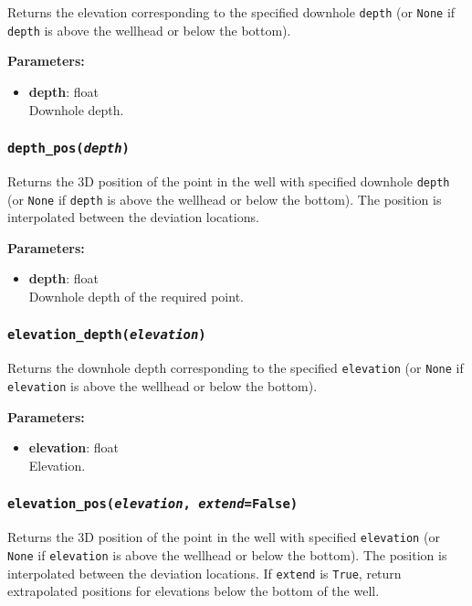 Returns the elevation corresponding to the specified downhole \texttt{depth} (or \texttt{None} if \texttt{depth} is above the wellhead or below the bottom).

\textbf{Parameters:}
\begin{itemize}
\item \textbf{depth}: float\\
  Downhole depth.
\end{itemize}

\subsubsection{\texttt{depth\_pos(\emph{depth})}}
\label{sec:well:depth_pos}

Returns the 3D position of the point in the well with specified downhole \texttt{depth} (or \texttt{None} if \texttt{depth} is above the wellhead or below the bottom).  The position is interpolated between the deviation locations.

\textbf{Parameters:}
\begin{itemize}
\item \textbf{depth}: float\\
  Downhole depth of the required point.
\end{itemize}

\subsubsection{\texttt{elevation\_depth(\emph{elevation})}}
\label{sec:well:elevation_depth}

Returns the downhole depth corresponding to the specified \texttt{elevation} (or \texttt{None} if \texttt{elevation} is above the wellhead or below the bottom).

\textbf{Parameters:}
\begin{itemize}
\item \textbf{elevation}: float\\
  Elevation.
\end{itemize}

\subsubsection{\texttt{elevation\_pos(\emph{elevation}, \emph{extend}=\texttt{False})}}
\label{sec:well:elevation_pos}

Returns the 3D position of the point in the well with specified \texttt{elevation} (or \texttt{None} if \texttt{elevation} is above the wellhead or below the bottom).  The position is interpolated between the deviation locations.  If \texttt{extend} is \texttt{True}, return extrapolated positions for elevations below the bottom of the well.

